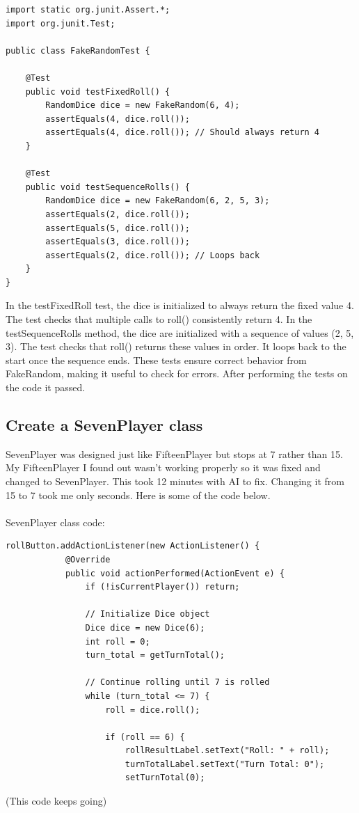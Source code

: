 \documentclass[a4paper,11pt]{article}
\begin{document}
\begin{lstlisting}
import static org.junit.Assert.*;
import org.junit.Test;

public class FakeRandomTest {

    @Test
    public void testFixedRoll() {
        RandomDice dice = new FakeRandom(6, 4);
        assertEquals(4, dice.roll());
        assertEquals(4, dice.roll()); // Should always return 4
    }

    @Test
    public void testSequenceRolls() {
        RandomDice dice = new FakeRandom(6, 2, 5, 3);
        assertEquals(2, dice.roll());
        assertEquals(5, dice.roll());
        assertEquals(3, dice.roll());
        assertEquals(2, dice.roll()); // Loops back
    }
}
\end{lstlisting}
 In the testFixedRoll test, the dice is initialized to always return the fixed value 4. The test checks that multiple calls to roll() consistently return 4. In the testSequenceRolls method, the dice are initialized with a sequence of values (2, 5, 3). The test checks that roll() returns these values in order. It loops back to the start once the sequence ends. These tests ensure correct behavior from FakeRandom, making it useful to check for errors. After performing the tests on the code it passed. 

\subsection*{Create a SevenPlayer class}
SevenPlayer was designed just like FifteenPlayer but stops at 7 rather than 15. My FifteenPlayer  I found out wasn't working properly so it was fixed and changed to SevenPlayer. This took 12 minutes with AI to fix. Changing it from 15 to 7 took me only seconds. Here is some of the code below. \\\\
SevenPlayer class code:
\begin{lstlisting}
rollButton.addActionListener(new ActionListener() {
            @Override
            public void actionPerformed(ActionEvent e) {
                if (!isCurrentPlayer()) return;
                
                // Initialize Dice object
                Dice dice = new Dice(6);
                int roll = 0;
                turn_total = getTurnTotal();
    
                // Continue rolling until 7 is rolled
                while (turn_total <= 7) {
                    roll = dice.roll();

                    if (roll == 6) {
                        rollResultLabel.setText("Roll: " + roll);
                        turnTotalLabel.setText("Turn Total: 0");
                        setTurnTotal(0);
\end{lstlisting} (This code keeps going)
\end{document}
